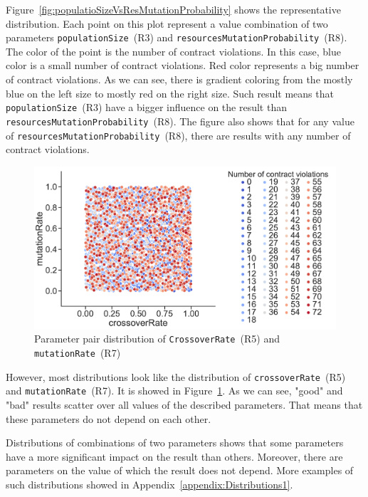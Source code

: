 Figure~\ref{fig:populatioSizeVsResMutationProbability} shows the representative distribution. Each point on this plot represent a value combination of two parameters \texttt{populationSize}~(R3) and \texttt{re\-so\-ur\-ces\-Mu\-ta\-ti\-on\-Pro\-ba\-bi\-li\-ty}~(R8). The color of the point is the number of contract violations. In this case, blue color is a small number of contract violations. Red color represents a big number of contract violations. As we can see, there is gradient coloring from the mostly blue on the left size to mostly red on the right size. Such result means that \texttt{po\-pu\-la\-ti\-on\-Si\-ze}~(R3) have a bigger influence on the result than \texttt{re\-so\-ur\-ces\-Mu\-ta\-ti\-on\-Pro\-ba\-bi\-li\-ty}~(R8). The figure also shows that for any value of \texttt{re\-so\-ur\-ces\-Mu\-ta\-ti\-on\-Pro\-ba\-bi\-li\-ty}~(R8), there are results with any number of contract violations.

\begin{figure}
	\centering
	\includegraphics[width=\textwidth]{images/CrossoverRateVsutationRate.pdf}
	\caption[Parameter pair distribution of \texttt{CrossoverRate}~(R5) and \texttt{mutationRate}~(R7)]{Parameter pair distribution of \texttt{CrossoverRate}~(R5) and \texttt{mutationRate}~(R7)}
	\label{fig:CrossoverRateVsMutationRate}
\end{figure}

However, most distributions look like the distribution of \texttt{crossoverRate}~(R5) and \texttt{mutationRate}~(R7). It is showed in Figure~\ref{fig:CrossoverRateVsMutationRate}. As we can see, "good" and "bad" results scatter over all values of the described parameters. That means that these parameters do not depend on each other.

Distributions of combinations of two parameters shows that some parameters have a more significant impact on the result than others. Moreover, there are parameters on the value of which the result does not depend. More examples of such distributions showed in Appendix~\ref{appendix:Distributions1}.

